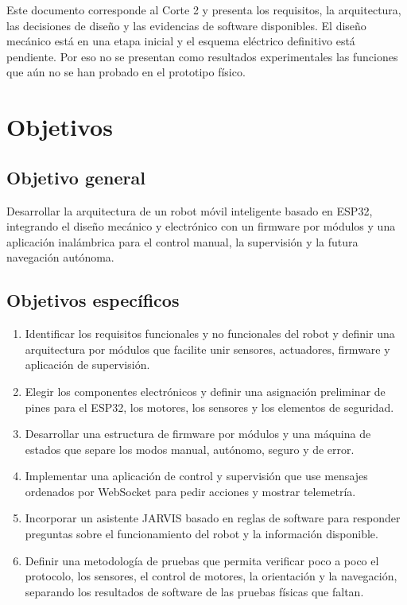\documentclass[journal]{IEEEtran}
\begin{document}
Este documento corresponde al Corte 2 y presenta los requisitos, la arquitectura, las decisiones de diseño y las evidencias de software disponibles. El diseño mecánico está en una etapa inicial y el esquema eléctrico definitivo está pendiente. Por eso no se presentan como resultados experimentales las funciones que aún no se han probado en el prototipo físico.

\section{Objetivos}

\subsection{Objetivo general}

Desarrollar la arquitectura de un robot móvil inteligente basado en ESP32, integrando el diseño mecánico y electrónico con un firmware por módulos y una aplicación inalámbrica para el control manual, la supervisión y la futura navegación autónoma.

\subsection{Objetivos específicos}

\begin{enumerate}[1.]
    \item Identificar los requisitos funcionales y no funcionales del robot y definir una arquitectura por módulos que facilite unir sensores, actuadores, firmware y aplicación de supervisión.

    \item Elegir los componentes electrónicos y definir una asignación preliminar de pines para el ESP32, los motores, los sensores y los elementos de seguridad.

    \item Desarrollar una estructura de firmware por módulos y una máquina de estados que separe los modos manual, autónomo, seguro y de error.

    \item Implementar una aplicación de control y supervisión que use mensajes ordenados por WebSocket para pedir acciones y mostrar telemetría.

    \item Incorporar un asistente JARVIS basado en reglas de software para responder preguntas sobre el funcionamiento del robot y la información disponible.

    \item Definir una metodología de pruebas que permita verificar poco a poco el protocolo, los sensores, el control de motores, la orientación y la navegación, separando los resultados de software de las pruebas físicas que faltan.
\end{enumerate}
\end{document}
